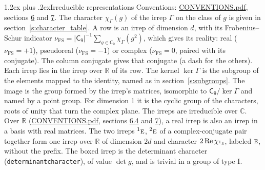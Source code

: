 \documentclass[10pt,a4paper]{article}
\makeatletter
\renewcommand\section{\@startsection{section}{1}{\z@}{-3ex plus -1ex minus -.2ex}%
  {1.2ex plus .2ex}{\normalfont\large\sffamily\bfseries\color{parttitle}}}
\numberwithin{equation}{section}
\newcommand{\grp}[1]{\mathsf{#1}}
\newcommand{\irr}[1]{\text{\normalfont\scshape #1}}
\newcommand{\conjpair}[1]{{}^{#1}}
\newcommand{\irchar}[1]{\chi_{#1}}
\newcommand{\fsind}{\nu_{\mathrm{FS}}}
\makeatother
\begin{document}
\section{Irreducible representations}\label{s:irreps}
Conventions: \href{../../CONVENTIONS.pdf}{CONVENTIONS.pdf}, sections \href{../../CONVENTIONS.pdf\#conv.6}{6} and \href{../../CONVENTIONS.pdf\#conv.7}{7}.
\leavevmode\label{n:function.character}\label{n:irrep.Gamma}The character $\irchar{\Gamma}(g)$ of the irrep $\Gamma$ on the class of $g$ is given in section~\ref{s:character_table}.
\leavevmode\label{n:index.dimension}\label{n:index.frobenius}\label{n:head.irrep}\label{n:head.reality}A row is an irrep of dimension $d$, with its Frobenius--Schur indicator $\fsind = |\grp{C_{9}}|^{-1}\allowbreak\sum_{g\in\grp{C_{9}}}\irchar{\Gamma}(g^2)$, which gives its reality: real ($\fsind = +1$), pseudoreal ($\fsind = -1$) or complex ($\fsind = 0$, paired with its conjugate). \label{n:head.conjugate}The column conjugate gives that conjugate (a dash for the others). \label{n:head.over.real}Each irrep lies in the irrep over $\mathbb{R}$ of its row. \label{n:head.kernel}The kernel $\ker\Gamma$ is the subgroup of the elements mapped to the identity, named as in section~\ref{s:subgroups}. \label{n:head.image}The image is the group formed by the irrep's matrices, isomorphic to $\grp{C_{9}}/\ker\Gamma$ and named by a point group. For dimension 1 it is the cyclic group of the characters, roots of unity that turn the complex plane. The irreps are irreducible over $\mathbb{C}$. Over $\mathbb{R}$ (\href{../../CONVENTIONS.pdf}{CONVENTIONS.pdf}, sections \href{../../CONVENTIONS.pdf\#conv.6.4}{6.4} and \href{../../CONVENTIONS.pdf\#conv.7}{7}), a real irrep is also an irrep in a basis with real matrices. The two irreps $\conjpair{1}\irr{e}$, $\conjpair{2}\irr{e}$ of a complex-conjugate pair together form one irrep over $\mathbb{R}$ of dimension $2d$ and character $2\operatorname{Re}\irchar{\conjpair{1}\irr{e}}$, labeled $\irr{e}$, without the prefix. \label{n:mark.determinant}The boxed irrep is the determinant character (\texttt{determinantcharacter}), of value $\det g$, and is trivial in a group of type I.
\setlength{\emergencystretch}{2em}\par\setlength{\emergencystretch}{0pt}
\end{document}
